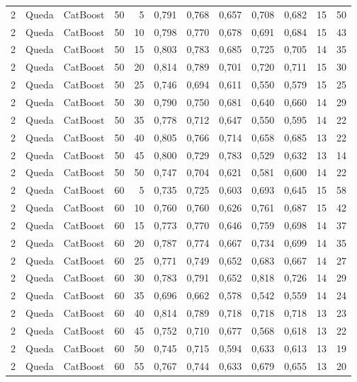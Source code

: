\begin{longtable}{@{}rllrrrrrrrrr@{}}
2 & Queda & CatBoost & 50 & 5 & 0,791 & 0,768 & 0,657 & 0,708 & 0,682 & 15 & 50 \\
2 & Queda & CatBoost & 50 & 10 & 0,798 & 0,770 & 0,678 & 0,691 & 0,684 & 15 & 43 \\
2 & Queda & CatBoost & 50 & 15 & 0,803 & 0,783 & 0,685 & 0,725 & 0,705 & 14 & 35 \\
2 & Queda & CatBoost & 50 & 20 & 0,814 & 0,789 & 0,701 & 0,720 & 0,711 & 15 & 30 \\
2 & Queda & CatBoost & 50 & 25 & 0,746 & 0,694 & 0,611 & 0,550 & 0,579 & 15 & 25 \\
2 & Queda & CatBoost & 50 & 30 & 0,790 & 0,750 & 0,681 & 0,640 & 0,660 & 14 & 29 \\
2 & Queda & CatBoost & 50 & 35 & 0,778 & 0,712 & 0,647 & 0,550 & 0,595 & 14 & 22 \\
2 & Queda & CatBoost & 50 & 40 & 0,805 & 0,766 & 0,714 & 0,658 & 0,685 & 13 & 22 \\
2 & Queda & CatBoost & 50 & 45 & 0,800 & 0,729 & 0,783 & 0,529 & 0,632 & 13 & 14 \\
2 & Queda & CatBoost & 50 & 50 & 0,747 & 0,704 & 0,621 & 0,581 & 0,600 & 14 & 22 \\
2 & Queda & CatBoost & 60 & 5 & 0,735 & 0,725 & 0,603 & 0,693 & 0,645 & 15 & 58 \\
2 & Queda & CatBoost & 60 & 10 & 0,760 & 0,760 & 0,626 & 0,761 & 0,687 & 15 & 42 \\
2 & Queda & CatBoost & 60 & 15 & 0,773 & 0,770 & 0,646 & 0,759 & 0,698 & 14 & 37 \\
2 & Queda & CatBoost & 60 & 20 & 0,787 & 0,774 & 0,667 & 0,734 & 0,699 & 14 & 35 \\
2 & Queda & CatBoost & 60 & 25 & 0,771 & 0,749 & 0,652 & 0,683 & 0,667 & 14 & 27 \\
2 & Queda & CatBoost & 60 & 30 & 0,783 & 0,791 & 0,652 & 0,818 & 0,726 & 14 & 29 \\
2 & Queda & CatBoost & 60 & 35 & 0,696 & 0,662 & 0,578 & 0,542 & 0,559 & 14 & 24 \\
2 & Queda & CatBoost & 60 & 40 & 0,814 & 0,789 & 0,718 & 0,718 & 0,718 & 13 & 23 \\
2 & Queda & CatBoost & 60 & 45 & 0,752 & 0,710 & 0,677 & 0,568 & 0,618 & 13 & 22 \\
2 & Queda & CatBoost & 60 & 50 & 0,745 & 0,715 & 0,594 & 0,633 & 0,613 & 13 & 19 \\
2 & Queda & CatBoost & 60 & 55 & 0,767 & 0,744 & 0,633 & 0,679 & 0,655 & 13 & 20 \\

\end{longtable}
